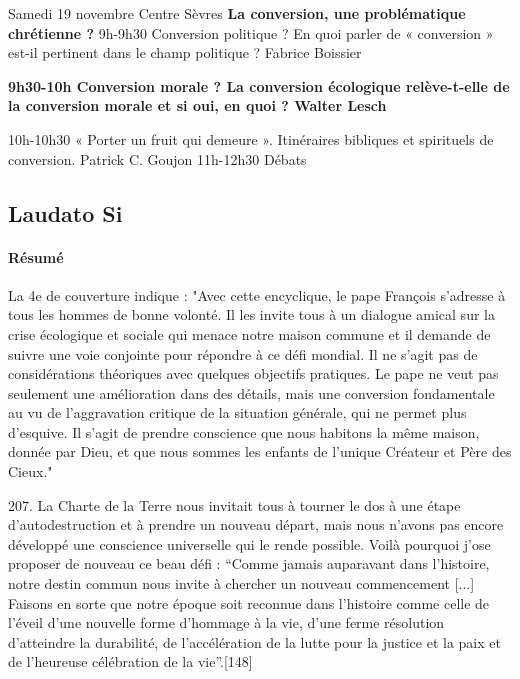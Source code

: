 Samedi 19 novembre  Centre Sèvres  \textbf{La conversion, une problématique chrétienne ?}  9h-9h30 Conversion politique ?  En quoi parler de « conversion » est-il pertinent dans le champ politique ? Fabrice Boissier 

\textbf{9h30-10h Conversion morale ?  La conversion écologique relève-t-elle de la conversion morale et si oui, en quoi ?     Walter Lesch } 

10h-10h30 « Porter un fruit qui demeure ». Itinéraires bibliques et spirituels de conversion.  Patrick C. Goujon  
11h-12h30 Débats


\subsection{Laudato Si}
\cite{francois_laudato_2015}

\paragraph{Résumé}  
\begin{singlequote}
       La 4e de couverture indique : "Avec cette encyclique, le pape François s'adresse à tous les hommes de bonne volonté. Il les invite tous à un dialogue amical sur la crise écologique et sociale qui menace notre maison commune et il demande de suivre une voie conjointe pour répondre à ce défi mondial. Il ne s'agit pas de considérations théoriques avec quelques objectifs pratiques. Le pape ne veut pas seulement une amélioration dans des détails, mais une conversion fondamentale au vu de l'aggravation critique de la situation générale, qui ne permet plus d'esquive. Il s'agit de prendre conscience que nous habitons la même maison, donnée par Dieu, et que nous sommes les enfants de l'unique Créateur et Père des Cieux."
\end{singlequote}

\begin{singlequote}
        207. La Charte de la Terre nous invitait tous à tourner le dos à une étape d’autodestruction et à prendre un nouveau départ, mais nous n’avons pas encore développé une conscience universelle qui le rende possible. Voilà pourquoi j’ose proposer de nouveau ce beau défi : “Comme jamais auparavant dans l’histoire, notre destin commun nous invite à chercher un nouveau commencement [...] Faisons en sorte que notre époque soit reconnue dans l’histoire comme celle de l’éveil d’une nouvelle forme d’hommage à la vie, d’une ferme résolution d’atteindre la durabilité, de l’accélération de la lutte pour la justice et la paix et de l’heureuse célébration de la vie”.[148]
\end{singlequote}
       
